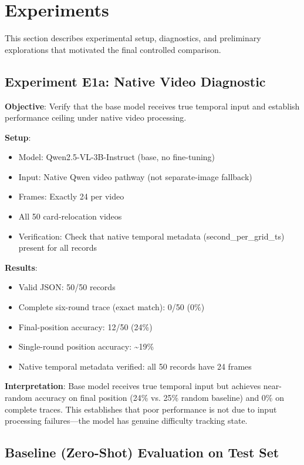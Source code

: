 \section{Experiments}
\label{sec:experiments}

This section describes experimental setup, diagnostics, and preliminary explorations that motivated the final controlled comparison.

\subsection{Experiment E1a: Native Video Diagnostic}

\textbf{Objective}: Verify that the base model receives true temporal input and establish performance ceiling under native video processing.

\textbf{Setup}:
\begin{itemize}
    \item Model: Qwen2.5-VL-3B-Instruct (base, no fine-tuning)
    \item Input: Native Qwen video pathway (not separate-image fallback)
    \item Frames: Exactly 24 per video
    \item All 50 card-relocation videos
    \item Verification: Check that native temporal metadata (second\_per\_grid\_ts) present for all records
\end{itemize}

\textbf{Results}:
\begin{itemize}
    \item Valid JSON: 50/50 records
    \item Complete six-round trace (exact match): 0/50 (0\%)
    \item Final-position accuracy: 12/50 (24\%)
    \item Single-round position accuracy: \textasciitilde19\%
    \item Native temporal metadata verified: all 50 records have 24 frames
\end{itemize}

\textbf{Interpretation}: Base model receives true temporal input but achieves near-random accuracy on final position (24\% vs. 25\% random baseline) and 0\% on complete traces. This establishes that poor performance is not due to input processing failures---the model has genuine difficulty tracking state.

\subsection{Baseline (Zero-Shot) Evaluation on Test Set}

